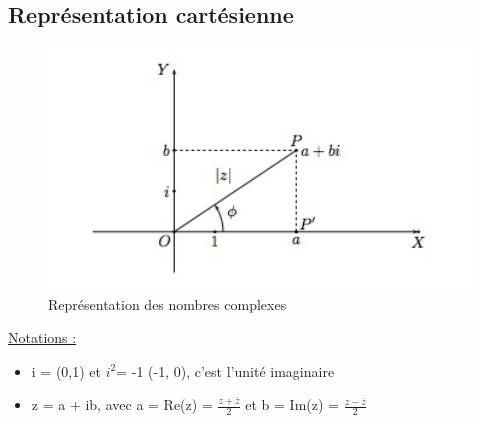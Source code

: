 \documentclass{article}
\begin{document}
\subsection{Représentation cartésienne}
\begin{figure}[htp]
    \centering
    \includegraphics[width=12cm]{Images/complexe2.jpeg}
    \caption{Représentation des nombres complexes}
    \label{fig:complex}
\end{figure} 
\underline{Notations :} 
\begin{itemize}
    \item i = (0,1) et \(i^2\)= -1 (-1, 0), c'est l'unité imaginaire 
    \item z = a + ib, \qquad \qquad \qquad \qquad avec a = Re(z) = \( \frac{z + \overline{z}}{2}\) et b = Im(z) = \( \frac{z - \overline{z}}{2}\)
\end{itemize}
\end{document}
